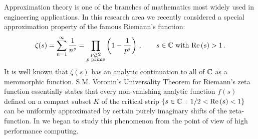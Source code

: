 Approximation theory is one of the branches of mathematics most widely
used in engineering applications.
In this research area we recently considered a special approximation property
of the famous Riemann's function:
\begin{equation}
\zeta(s) = \sum_{n=1}^\infty \frac{1}{n^s}
= \prod_{\substack{ p\geq 2 \\ \text{$p$ prime} }}
  \left( 1 - \frac{1}{p^s} \right)\,, \qquad
s\in{\mathbb C }\ \text{with}\ \mbox{\rm Re}\,(s)>1\,.
\end{equation}
It is well known that $\zeta(s)$ has an analytic continuation to all
of ${\mathbb C }$ as a meromorphic function.
S.M. Voronin's Universality Theorem \cite{voronin} for Riemann's zeta function
essentially states that every non-vanishing analytic function $f(s)$ defined
on a compact subset $K$ of the critical strip
$\{s\in{\mathbb C } \mathop{\;:\;}\nolimits 1/2 < \mbox{\rm Re}\,(s) < 1\}$
can be uniformly approximated by certain purely imaginary shifts of the
zeta-function. 
In \cite{herplasa} we began to study this phenomenon from the point of view
of high performance computing.
